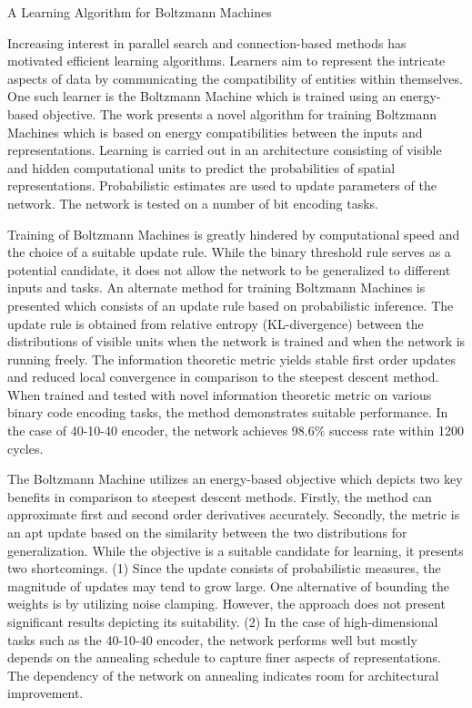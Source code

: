 \documentclass[11pt,letterpaper]{article}
\begin{document}
\begin{center}
  \large{A Learning Algorithm for Boltzmann Machines}
\end{center}


Increasing interest in parallel search and connection-based methods has motivated efficient learning algorithms. Learners aim to represent the intricate aspects of data by communicating the compatibility of entities within themselves. One such learner is the Boltzmann Machine which is trained using an energy-based objective. The work presents a novel algorithm for training Boltzmann Machines which is based on energy compatibilities between the inputs and representations. Learning is carried out in an architecture consisting of visible and hidden computational units to predict the probabilities of spatial representations. Probabilistic estimates are used to update parameters of the network. The network is tested on a number of bit encoding tasks. 

Training of Boltzmann Machines is greatly hindered by computational speed and the choice of a suitable update rule. While the binary threshold rule serves as a potential candidate, it does not allow the network to be generalized to different inputs and tasks. An alternate method for training Boltzmann Machines is presented which consists of an update rule based on probabilistic inference. The update rule is obtained from relative entropy (KL-divergence) between the distributions of visible units when the network is trained and when the network is running freely. The information theoretic metric yields stable first order updates and reduced local convergence in comparison to the steepest descent method. When trained and tested with novel information theoretic metric on various binary code encoding tasks, the method demonstrates suitable performance. In the case of 40-10-40 encoder, the network achieves 98.6\% success rate within 1200 cycles. 

The Boltzmann Machine utilizes an energy-based objective which depicts two key benefits in comparison to steepest descent methods. Firstly, the method can approximate first and second order derivatives accurately. Secondly, the metric is an apt update based on the similarity between the two distributions for generalization. While the objective is a suitable candidate for learning, it presents two shortcomings. (1) Since the update consists of probabilistic measures, the magnitude of updates may tend to grow large. One alternative of bounding the weights is by utilizing noise clamping. However, the approach does not present significant results depicting its suitability. (2) In the case of high-dimensional tasks such as the 40-10-40 encoder, the network performs well but mostly depends on the annealing schedule to capture finer aspects of representations. The dependency of the network on annealing indicates room for architectural improvement.  
\end{document}
